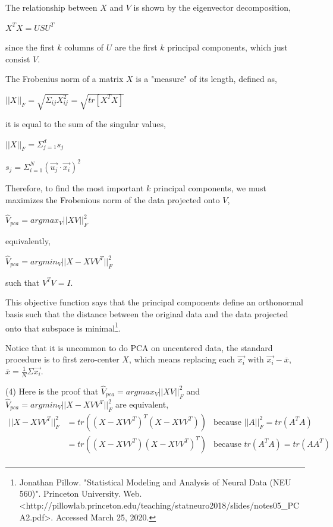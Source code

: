 \documentclass[11pt]{article}
\begin{document}
\begin{solution}
\item The relationship between $X$ and $V$ is shown by the eigenvector decomposition,
\begin{center}
$X^T X = USU^T$
\end{center}
since the first $k$ columns of $U$ are the first $k$ principal components, which just consist $V$.
\item The Frobenius norm of a matrix $X$ is a "measure" of its length, defined as,
\begin{center}
$||X||_{F} = \sqrt{\Sigma_{ij}{X_{ij}^2}} = \sqrt{tr[X^TX]}$
\end{center}
\pagebreak
it is equal to the sum of the singular values,
\begin{center}
$||X||_{F} = \Sigma_{j=1}^{d}{s_j}$\\
\item
$s_j = \Sigma_{i=1}^{N}{(\vec{u_j} \cdot \vec{x_i})^2}$
\end{center}
Therefore, to find the most important $k$ principal components, we must maximizes the Frobenious norm of the data projected onto $V$,  
\begin{center}
$\hat{V}_{pca} = argmax_{V} || X V ||_F^{2}$
\end{center}
equivalently, 
\begin{center}
$\hat{V}_{pca} = argmin_{V} || X - XVV^T ||_F^{2}$
\end{center}
such that $V^TV = I$. 
\item This objective function says that the principal components define an orthonormal basis such that the distance between the original data and the data projected onto that subspace is minimal\footnote{Jonathan Pillow. "Statistical Modeling and Analysis of Neural Data (NEU 560)". Princeton University. Web. <http://pillowlab.princeton.edu/teaching/statneuro2018/slides/notes05\_PCA2.pdf>. Accessed March 25, 2020.}.
\item Notice that it is uncommon to do PCA on uncentered data, the standard procedure is to first zero-center $X$, which means replacing each $\vec{x_i}$ with $\vec{x_i} - \overline{x}$, $\overline{x} = \frac{1}{N} \Sigma{\vec{x_i}}$. 
\item (4) Here is the proof that $\hat{V}_{pca} = argmax_{V} || X V ||_F^{2}$ and $\hat{V}_{pca} = argmin_{V} || X - XVV^T ||_F^{2}$ are equivalent,
\begin{align*}
	|| X - XVV^T ||_F^{2}
	& = tr((X - XVV^T)^T(X - XVV^T)) & \text{because ${||A||_{F}^2 = tr(A^TA)}$}  \\
	& = tr((X - XVV^T)(X - XVV^T)^T) & \text{because ${tr(A^TA) = tr(AA^T)}$} \\

\end{align*}
\end{solution}
\end{document}
